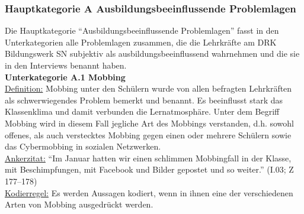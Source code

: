 \subsubsection{Hauptkategorie A Ausbildungsbeeinflussende Problemlagen}
\label{sec:HauptkategorieAAusbildungsbeeinflussendeProblemlagen}

Die Hauptkategorie "`Ausbildungsbeeinflussende Problemlagen"' fasst in den Unterkategorien alle Problemlagen zusammen, die die Lehrkräfte am DRK Bildungswerk SN subjektiv als ausbildungsbeeinflussend wahrnehmen und die sie in den Interviews benannt haben.\\

\textbf{Unterkategorie A.1 Mobbing}\\
\underline{Definition:} Mobbing unter den Schülern wurde von allen befragten Lehrkräften als schwerwiegendes Problem bemerkt und benannt. Es beeinflusst stark das Klassenklima und damit verbunden die Lernatmosphäre. Unter dem Begriff Mobbing wird in diesem Fall jegliche Art des Mobbings verstanden, d.h. sowohl offenes, als auch verstecktes Mobbing gegen einen oder mehrere Schülern sowie das Cybermobbing in sozialen Netzwerken.\\
\underline{Ankerzitat:} "`Im Januar hatten wir einen schlimmen Mobbingfall in der Klasse, mit Beschimpfungen, mit Facebook und Bilder gepostet und so weiter."' (I.03; Z 177--178)\\
\underline{Kodierregel:} Es werden Aussagen kodiert, wenn in ihnen eine der verschiedenen Arten von Mobbing ausgedrückt werden.\\

